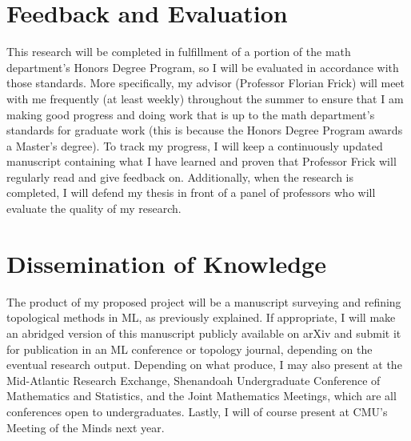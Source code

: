 \documentclass[12pt]{article}
\begin{document}
\section{Feedback and Evaluation}
This research will be completed in fulfillment of a portion of the math department's Honors Degree Program, so I will be evaluated in accordance with those standards.
More specifically, my advisor (Professor Florian Frick) will meet with me frequently (at least weekly) throughout the summer to ensure that I am making good progress and doing work that is up to the math department's standards for graduate work (this is because the Honors Degree Program awards a Master's degree).
To track my progress, I will keep a continuously updated manuscript containing what I have learned and proven that Professor Frick will regularly read and give feedback on.
Additionally, when the research is completed, I will defend my thesis in front of a panel of professors who will evaluate the quality of my research.


\section{Dissemination of Knowledge}
The product of my proposed project will be a manuscript surveying and refining topological methods in ML, as previously explained.
If appropriate, I will make an abridged version of this manuscript publicly available on arXiv and submit it for publication in an ML conference or topology journal, depending on the eventual research output.
Depending on what produce, I may also present at the Mid-Atlantic Research Exchange, Shenandoah Undergraduate Conference of Mathematics and Statistics, and the Joint Mathematics Meetings, which are all conferences open to undergraduates.
Lastly, I will of course present at CMU's Meeting of the Minds next year.

\newpage
\printbibliography
\end{document}
